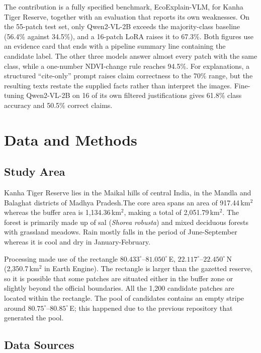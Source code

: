 \documentclass[11pt]{article}
\begin{document}
The contribution is a fully specified benchmark, EcoExplain-VLM, for
Kanha Tiger Reserve, together with an evaluation that reports its own
weaknesses. On the 55-patch test set, only Qwen2-VL-2B exceeds the
majority-class baseline (56.4\% against 34.5\%), and a 16-patch LoRA
raises it to 67.3\%. Both figures use an evidence card that ends with a
pipeline summary line containing the candidate label. The other three
models answer almost every patch with the same class, while a
one-number NDVI-change rule reaches 94.5\%. For explanations, a
structured ``cite-only'' prompt raises claim correctness to the 70\%
range, but the resulting texts restate the supplied facts rather than
interpret the images. Fine-tuning Qwen2-VL-2B on 16 of its own filtered
justifications gives 61.8\% class accuracy and 50.5\% correct claims.


\section{Data and Methods}

\subsection{Study Area}

Kanha Tiger Reserve lies in the Maikal hills of central India, in the
Mandla and Balaghat districts of Madhya Pradesh.The core area spans an area of
917.44\,km$^2$ whereas the buffer area is 1,134.36\,km$^2$, making a total
of 2,051.79\,km$^2$. The forest is primarily made up of sal (\emph{Shorea
robusta}) and mixed deciduous forests with grassland meadows. Rain mostly
falls in the period of June-September whereas it is cool and dry in
January-February.

Processing made use of the rectangle
$80.433^\circ$--$81.050^\circ$\,E,
$22.117^\circ$--$22.450^\circ$\,N (2,350.7\,km$^2$ in Earth Engine).
The rectangle is larger than the gazetted reserve, so it is possible
that some patches are situated either in the buffer zone or slightly
beyond the official boundaries. All the 1,200 candidate patches are
located within the rectangle. The pool of candidates contains an empty
stripe around $80.75^\circ$--$80.85^\circ$\,E; this happened due to
the previous repository that generated the pool.

\subsection{Data Sources}
\end{document}

